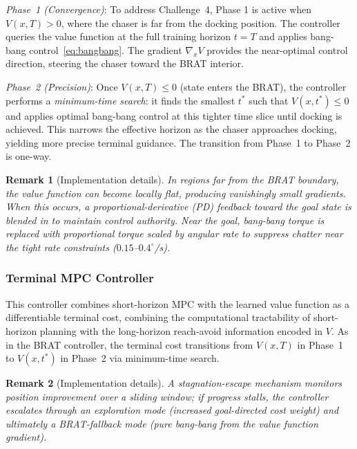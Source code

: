 \documentclass[letterpaper, 10 pt, conference]{ieeeconf}
\newtheorem{remark}{Remark}
\begin{document}
\emph{Phase~1 (Convergence)}: To address Challenge~4, Phase 1 is active when $V(x, T) > 0$, where the chaser is far from the docking position. The controller queries the value function at the full training horizon $t = T$ and applies bang-bang control~\eqref{eq:bangbang}. The gradient $\nabla_x V$ provides the near-optimal control direction, steering the chaser toward the BRAT interior.

\emph{Phase~2 (Precision)}: Once $V(x, T) \leq 0$ (state enters the BRAT), the controller performs a \emph{minimum-time search}: it finds the smallest $t^*$ such that $V(x, t^*) \leq 0$ and applies optimal bang-bang control at this tighter time slice until docking is achieved. This narrows the effective horizon as the chaser approaches docking, yielding more precise terminal guidance. The transition from Phase~1 to Phase~2 is one-way.

\begin{remark}[Implementation details]
In regions far from the BRAT boundary, the value function can become locally flat, producing vanishingly small gradients. When this occurs, a proportional-derivative (PD) feedback toward the goal state is blended in to maintain control authority. Near the goal, bang-bang torque is replaced with proportional torque scaled by angular rate to suppress chatter near the tight rate constraints ($0.15$--$0.4^\circ$/s).
\end{remark}

\subsubsection{Terminal MPC Controller}
This controller combines short-horizon MPC with the learned value function as a differentiable terminal cost, combining the computational tractability of short-horizon planning with the long-horizon reach-avoid information encoded in $V$. As in the BRAT controller, the terminal cost transitions from $V(x, T)$ in Phase~1 to $V(x, t^*)$ in Phase~2 via minimum-time search. 

\begin{remark}[Implementation details]
A stagnation-escape mechanism monitors position improvement over a sliding window; if progress stalls, the controller escalates through an exploration mode (increased goal-directed cost weight) and ultimately a BRAT-fallback mode (pure bang-bang from the value function gradient).
\end{remark}
\end{document}
